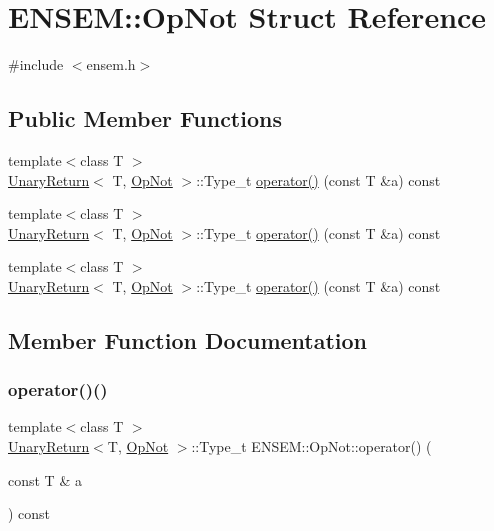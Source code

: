 \hypertarget{structENSEM_1_1OpNot}{}\section{E\+N\+S\+EM\+:\+:Op\+Not Struct Reference}
\label{structENSEM_1_1OpNot}


{\ttfamily \#include $<$ensem.\+h$>$}

\subsection*{Public Member Functions}
\begin{DoxyCompactItemize}
\item 
{\footnotesize template$<$class T $>$ }\\\mbox{\hyperlink{structENSEM_1_1UnaryReturn}{Unary\+Return}}$<$ T, \mbox{\hyperlink{structENSEM_1_1OpNot}{Op\+Not}} $>$\+::Type\+\_\+t \mbox{\hyperlink{structENSEM_1_1OpNot_a0e48693c476abfbda4c8abafefe17ad9}{operator()}} (const T \&a) const
\item 
{\footnotesize template$<$class T $>$ }\\\mbox{\hyperlink{structENSEM_1_1UnaryReturn}{Unary\+Return}}$<$ T, \mbox{\hyperlink{structENSEM_1_1OpNot}{Op\+Not}} $>$\+::Type\+\_\+t \mbox{\hyperlink{structENSEM_1_1OpNot_a0e48693c476abfbda4c8abafefe17ad9}{operator()}} (const T \&a) const
\item 
{\footnotesize template$<$class T $>$ }\\\mbox{\hyperlink{structENSEM_1_1UnaryReturn}{Unary\+Return}}$<$ T, \mbox{\hyperlink{structENSEM_1_1OpNot}{Op\+Not}} $>$\+::Type\+\_\+t \mbox{\hyperlink{structENSEM_1_1OpNot_a0e48693c476abfbda4c8abafefe17ad9}{operator()}} (const T \&a) const
\end{DoxyCompactItemize}


\subsection{Member Function Documentation}
\mbox{\label{structENSEM_1_1OpNot_a0e48693c476abfbda4c8abafefe17ad9}} 
\subsubsection{\texorpdfstring{operator()()}{operator()()}\hspace{0.1cm}{\footnotesize\ttfamily [1/3]}}
{\footnotesize\ttfamily template$<$class T $>$ \\
\mbox{\hyperlink{structENSEM_1_1UnaryReturn}{Unary\+Return}}$<$T, \mbox{\hyperlink{structENSEM_1_1OpNot}{Op\+Not}} $>$\+::Type\+\_\+t E\+N\+S\+E\+M\+::\+Op\+Not\+::operator() (\begin{DoxyParamCaption}\item[{const T \&}]{a }\end{DoxyParamCaption}) const\hspace{0.3cm}{\ttfamily [inline]}}

